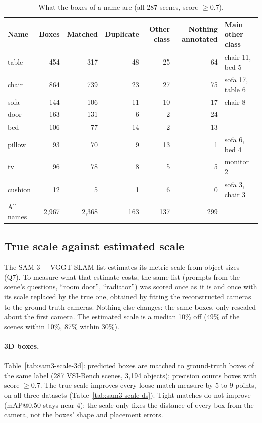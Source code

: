 \begin{table}[t]
\centering
\caption{What the boxes of a name are (all 287 scenes, score $\geq 0.7$).}
\label{tab:sam3-a5x}
\begin{tabular}{lrrrrrl}
\toprule
Name & Boxes & Matched & Duplicate & Other class & Nothing annotated & Main other class \\
\midrule
table   & 454 & 317 & 48 & 25 & 64 & chair 11, bed 5 \\
chair   & 864 & 739 & 23 & 27 & 75 & sofa 17, table 6 \\
sofa    & 144 & 106 & 11 & 10 & 17 & chair 8 \\
door    & 163 & 131 &  6 &  2 & 24 & -- \\
bed     & 106 &  77 & 14 &  2 & 13 & -- \\
pillow  &  93 &  70 &  9 & 13 &  1 & sofa 6, bed 4 \\
tv      &  96 &  78 &  8 &  5 &  5 & monitor 2 \\
cushion &  12 &   5 &  1 &  6 &  0 & sofa 3, chair 3 \\
\midrule
All names & 2,967 & 2,368 & 163 & 137 & 299 & \\
\bottomrule
\end{tabular}
\end{table}

\subsection{True scale against estimated scale}
\label{sec:sam3-scale}

The SAM 3 + VGGT-SLAM list estimates its metric scale from object sizes (Q7). To measure what that estimate costs, the
same list (prompts from the scene's questions, ``room door'', ``radiator'') was scored once as it is and once with
its scale replaced by the true one, obtained by fitting the reconstructed cameras to the ground-truth cameras.
Nothing else changes: the same boxes, only rescaled about the first camera. The estimated scale is a median 10\%
off (49\% of the scenes within 10\%, 87\% within 30\%).

\paragraph{3D boxes.} Table~\ref{tab:sam3-scale-3d}: predicted boxes are matched to ground-truth boxes of the same
label (287 VSI-Bench scenes, 3,194 objects); precision counts boxes with score $\geq 0.7$. The true scale improves
every loose-match measure by 5 to 9 points, on all three datasets (Table~\ref{tab:sam3-scale-ds}). Tight matches do
not improve (mAP@0.50 stays near 4): the scale only fixes the distance of every box from the camera, not the boxes'
shape and placement errors.

